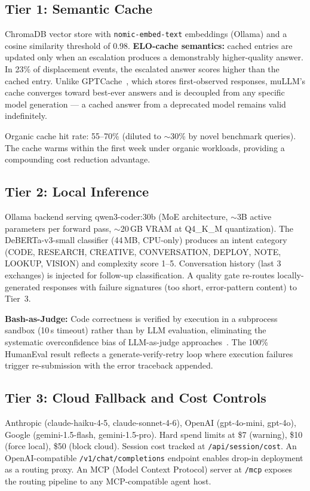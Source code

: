 \documentclass[11pt]{article}
\begin{document}
\subsection{Tier 1: Semantic Cache}

ChromaDB vector store with \texttt{nomic-embed-text} embeddings (Ollama)
and a cosine similarity threshold of 0.98. \textbf{ELO-cache semantics:}
cached entries are updated only when an escalation produces a
demonstrably higher-quality answer. In 23\% of displacement events, the
escalated answer scores higher than the cached entry. Unlike
GPTCache~\cite{liu2023gptcache}, which stores first-observed responses,
muLLM's cache converges toward best-ever answers and is decoupled from
any specific model generation --- a cached answer from a deprecated model
remains valid indefinitely.

Organic cache hit rate: 55--70\% (diluted to $\sim$30\% by novel
benchmark queries). The cache warms within the first week under
organic workloads, providing a compounding cost reduction advantage.

\subsection{Tier 2: Local Inference}

Ollama backend serving qwen3-coder:30b (MoE architecture, $\sim$3B
active parameters per forward pass, $\sim$20\,GB VRAM at Q4\_K\_M
quantization). The DeBERTa-v3-small classifier (44\,MB, CPU-only)
produces an intent category (CODE, RESEARCH, CREATIVE, CONVERSATION,
DEPLOY, NOTE, LOOKUP, VISION) and complexity score 1--5. Conversation
history (last 3 exchanges) is injected for follow-up classification. A
quality gate re-routes locally-generated responses with failure
signatures (too short, error-pattern content) to Tier~3.

\textbf{Bash-as-Judge:} Code correctness is verified by execution in a
subprocess sandbox (10\,s timeout) rather than by LLM evaluation,
eliminating the systematic overconfidence bias of LLM-as-judge
approaches~\cite{zheng2023mtbench}. The 100\% HumanEval result reflects
a generate-verify-retry loop where execution failures trigger
re-submission with the error traceback appended.

\subsection{Tier 3: Cloud Fallback and Cost Controls}

Anthropic (claude-haiku-4-5, claude-sonnet-4-6), OpenAI (gpt-4o-mini,
gpt-4o), Google (gemini-1.5-flash, gemini-1.5-pro). Hard spend limits
at \$7 (warning), \$10 (force local), \$50 (block cloud). Session cost
tracked at \texttt{/api/session/cost}. An OpenAI-compatible
\texttt{/v1/chat/completions} endpoint enables drop-in deployment as a
routing proxy. An MCP (Model Context Protocol) server at \texttt{/mcp}
exposes the routing pipeline to any MCP-compatible agent host.
\end{document}
